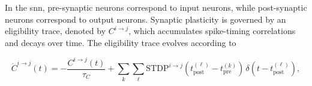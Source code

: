 




In the \ac{snn}, pre-synaptic neurons correspond to input neurons, while post-synaptic neurons correspond to output neurons. Synaptic plasticity is governed by an eligibility trace, denoted by $C^{i\rightarrow j}$, which accumulates spike-timing correlations and decays over time. The eligibility trace evolves according to~\cite{Ch_1_R22}


\begin{equation} \label{Eq.14}
    \dot{C}^{i\rightarrow j}(t)
    =
    -\frac{C^{i\rightarrow j}(t)}{\tau_C}
    +
    \sum_{k}\sum_{\ell}
    \text{STDP}^{i\rightarrow j}\!\left(t_{\text{post}}^{(\ell)} - t_{\text{pre}}^{(k)}\right)
    \,\delta\!\left(t - t_{\text{post}}^{(\ell)}\right),
\end{equation}


